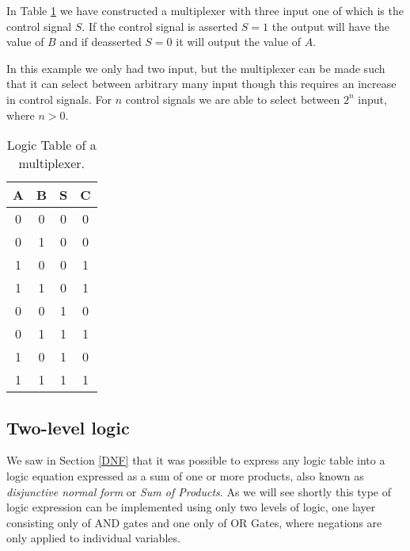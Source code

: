             In Table \ref{LogicTable:Multiplexer} we have constructed a multiplexer with three input one of which is the control signal $S$. If the control signal is asserted $S=1$ the output will have the value of $B$ and if deasserted $S=0$ it will output the value of $A$. 
            
            In this example we only had two input, but the multiplexer can be made such that it can select between arbitrary many input though this requires an increase in control signals. For $n$ control signals we are able to select between $2^{n}$ input, where $n > 0$.
            \begin{table}[h!]
                \centering
                \begin{tabular}{|c|c|c||c|}
                	\hline
                	\textbf{A} & \textbf{B} & \textbf{S} & \textbf{C} \\ \hline
                	    0      &     0      &     0      &     0      \\ \hline
                	    0      &     1      &     0      &     0      \\ \hline
                	    1      &     0      &     0      &     1      \\ \hline
                	    1      &     1      &     0      &     1      \\ \hline
                	    0      &     0      &     1      &     0      \\ \hline
                	    0      &     1      &     1      &     1      \\ \hline
                	    1      &     0      &     1      &     0      \\ \hline
                	    1      &     1      &     1      &     1      \\ \hline
                \end{tabular}
                \caption{Logic Table of a multiplexer.}
                \label{LogicTable:Multiplexer}
            \end{table}
        
        \subsection{Two-level logic}
        
            We saw in Section \ref{DNF} that it was possible to express any logic table into a logic equation expressed as a sum of one or more products, also known as \textit{disjunctive normal form} or \textit{Sum of Products}.
            As we will see shortly this type of logic expression can be implemented using only two levels of logic, one layer consisting only of AND gates and one only of OR Gates, where negations are only applied to individual variables.
            
